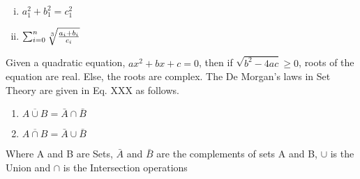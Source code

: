 \documentclass{article}
\begin{document}
	\large
	\begin{enumerate}[i.]
		\item $  a_1^2 + b_1^2 = c_1^2 $
		\item $ \sum_{i=0}^{n}  \sqrt[\leftroot{-1} 3]{\frac{a_i + b_i}{c_i}} $
	\end{enumerate}
	Given a quadratic equation, $ax^2 +bx+c=0$, then if $ \sqrt{b^2 - 4ac} \geq 0$, roots of
	the equation are real. Else, the roots are complex.
	\vspace{2cm}
	The De Morgan’s laws in Set Theory are given in Eq. XXX as follows.
	\begin{enumerate}
		\item $\overline{A \cup B} = \bar{A} \cap \bar{B} $
		\item $\overline{A \cap B} = \bar{A} \cup \bar{B} $
	\end{enumerate}
	Where A and B are Sets, $\bar{A}$ and $\bar{B}$ are the complements of sets A and B, $\cup$ is the Union and $\cap$ is the Intersection operations
\end{document}
